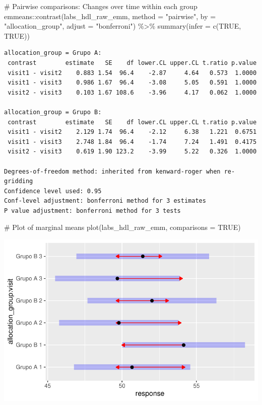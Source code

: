 \documentclass[
  12pt,
]{article}
\newenvironment{Shaded}{\begin{snugshade}}{\end{snugshade}}
\newcommand{\AttributeTok}[1]{\textcolor[rgb]{0.40,0.45,0.13}{#1}}
\newcommand{\CommentTok}[1]{\textcolor[rgb]{0.37,0.37,0.37}{#1}}
\newcommand{\ConstantTok}[1]{\textcolor[rgb]{0.56,0.35,0.01}{#1}}
\newcommand{\FunctionTok}[1]{\textcolor[rgb]{0.28,0.35,0.67}{#1}}
\newcommand{\NormalTok}[1]{\textcolor[rgb]{0.00,0.23,0.31}{#1}}
\newcommand{\SpecialCharTok}[1]{\textcolor[rgb]{0.37,0.37,0.37}{#1}}
\newcommand{\StringTok}[1]{\textcolor[rgb]{0.13,0.47,0.30}{#1}}
\begin{document}
\begin{Shaded}
\begin{Highlighting}[]
\CommentTok{\# Pairwise comparisons: Changes over time within each group}
\NormalTok{emmeans}\SpecialCharTok{::}\FunctionTok{contrast}\NormalTok{(labs\_hdl\_raw\_emm,}
\AttributeTok{method =} \StringTok{"pairwise"}\NormalTok{, }\AttributeTok{by =} \StringTok{"allocation\_group"}\NormalTok{,}
\AttributeTok{adjust =} \StringTok{"bonferroni"}\NormalTok{) }\SpecialCharTok{\%\textgreater{}\%} \FunctionTok{summary}\NormalTok{(}\AttributeTok{infer =} \FunctionTok{c}\NormalTok{(}\ConstantTok{TRUE}\NormalTok{, }\ConstantTok{TRUE}\NormalTok{))}
\end{Highlighting}
\end{Shaded}

\begin{verbatim}
allocation_group = Grupo A:
 contrast        estimate   SE    df lower.CL upper.CL t.ratio p.value
 visit1 - visit2    0.883 1.54  96.4    -2.87     4.64   0.573  1.0000
 visit1 - visit3    0.986 1.67  96.4    -3.08     5.05   0.591  1.0000
 visit2 - visit3    0.103 1.67 108.6    -3.96     4.17   0.062  1.0000

allocation_group = Grupo B:
 contrast        estimate   SE    df lower.CL upper.CL t.ratio p.value
 visit1 - visit2    2.129 1.74  96.4    -2.12     6.38   1.221  0.6751
 visit1 - visit3    2.748 1.84  96.4    -1.74     7.24   1.491  0.4175
 visit2 - visit3    0.619 1.90 123.2    -3.99     5.22   0.326  1.0000

Degrees-of-freedom method: inherited from kenward-roger when re-gridding 
Confidence level used: 0.95 
Conf-level adjustment: bonferroni method for 3 estimates 
P value adjustment: bonferroni method for 3 tests 
\end{verbatim}

\begin{Shaded}
\begin{Highlighting}[]
\CommentTok{\# Plot of marginal means}
\FunctionTok{plot}\NormalTok{(labs\_hdl\_raw\_emm, }\AttributeTok{comparisons =} \ConstantTok{TRUE}\NormalTok{)}
\end{Highlighting}
\end{Shaded}

\includegraphics{Outcomes_files/figure-pdf/labs_hdl_raw_emm-1.pdf}
\end{document}
